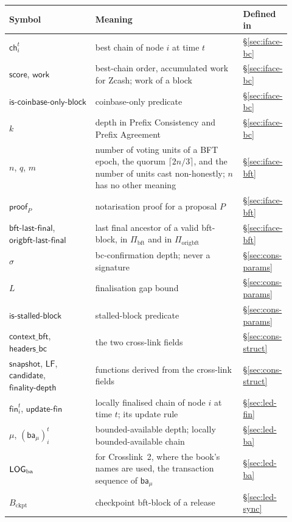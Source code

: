 \documentclass[11pt,a4paper]{article}
\theoremstyle{definition}
\newcommand{\bft}{\mathrm{bft}}
\newcommand{\score}{\mathsf{score}}
\newcommand{\work}{\mathsf{work}}
\newcommand{\ch}{\mathsf{ch}}
\newcommand{\Piorigbft}{\Pi_{\mathrm{origbft}}}
\newcommand{\Pibft}{\Pi_{\bft}}
\newcommand{\proofsym}{\mathsf{proof}}
\newcommand{\bftlastfinal}{\mathsf{bft\text{-}last\text{-}final}}
\newcommand{\origbftlastfinal}{\mathsf{origbft\text{-}last\text{-}final}}
\newcommand{\isstalledblock}{\mathsf{is\text{-}stalled\text{-}block}}
\newcommand{\iscoinbaseonlyblock}{\mathsf{is\text{-}coinbase\text{-}only\text{-}block}}
\newcommand{\contextbft}{\mathsf{context\_bft}}
\newcommand{\headersbc}{\mathsf{headers\_bc}}
\newcommand{\snapshot}{\mathsf{snapshot}}
\newcommand{\LF}{\mathsf{LF}}
\newcommand{\candidate}{\mathsf{candidate}}
\newcommand{\finalitydepth}{\mathsf{finality\text{-}depth}}
\newcommand{\fin}{\mathsf{fin}}
\newcommand{\ba}{\mathsf{ba}}
\newcommand{\updatefin}{\mathsf{update\text{-}fin}}
\newcommand{\Bckpt}{B_{\mathrm{ckpt}}}
\begin{document}
\begin{table}[tbp]
\ContinuedFloat
\centering
\footnotesize \renewcommand{\arraystretch}{1.1}
\begin{tabular}{@{}p{0.29\linewidth}p{0.52\linewidth}p{0.11\linewidth}@{}}
\toprule
Symbol & Meaning & Defined in \\
\midrule
$\ch_i^t$
  & best chain of node $i$ at time $t$
  & \S\ref{sec:iface-bc} \\
$\score$, $\work$
  & best-chain order, accumulated work for Zcash; work of a block
  & \S\ref{sec:iface-bc} \\
$\iscoinbaseonlyblock$
  & coinbase-only predicate
  & \S\ref{sec:iface-bc} \\
$k$
  & depth in Prefix Consistency and Prefix Agreement
  & \S\ref{sec:iface-bc} \\
$n$, $q$, $m$
  & number of voting units of a BFT epoch, the quorum $\lceil 2n/3 \rceil$,
  and the number of units cast non-honestly; $n$ has no other meaning
  & \S\ref{sec:iface-bft} \\
$\proofsym_P$
  & notarisation proof for a proposal $P$
  & \S\ref{sec:iface-bft} \\
$\bftlastfinal$, $\origbftlastfinal$
  & last final ancestor of a valid bft-block, in $\Pibft$ and in
  $\Piorigbft$
  & \S\ref{sec:iface-bft} \\
$\sigma$
  & bc-confirmation depth; never a signature
  & \S\ref{sec:cons-params} \\
$L$
  & finalisation gap bound
  & \S\ref{sec:cons-params} \\
$\isstalledblock$
  & stalled-block predicate
  & \S\ref{sec:cons-params} \\
$\contextbft$, $\headersbc$
  & the two cross-link fields
  & \S\ref{sec:cons-struct} \\
$\snapshot$, $\LF$, $\candidate$, $\finalitydepth$
  & functions derived from the cross-link fields
  & \S\ref{sec:cons-struct} \\
$\fin_i^t$, $\updatefin$
  & locally finalised chain of node $i$ at time $t$; its update rule
  & \S\ref{sec:led-fin} \\
$\mu$, $(\ba_\mu)_i^t$
  & bounded-available depth; locally bounded-available chain
  & \S\ref{sec:led-ba} \\
$\LOGba$
  & for Crosslink~2, where the book's names are used, the transaction
  sequence of $\ba_\mu$
  & \S\ref{sec:led-ba} \\
$\Bckpt$
  & checkpoint bft-block of a release
  & \S\ref{sec:led-sync} \\

\end{tabular}
\end{table}
\end{document}
